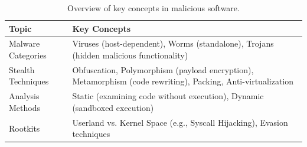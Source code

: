 \begin{table}[htbp]
\centering
\renewcommand{\arraystretch}{1.3}
\begin{tabular}{|l|p{10cm}|}
\hline
\textbf{Topic} & \textbf{Key Concepts} \\
\hline
Malware Categories & Viruses (host-dependent), Worms (standalone), Trojans (hidden malicious functionality) \\
Stealth Techniques & Obfuscation, Polymorphism (payload encryption), Metamorphism (code rewriting), Packing, Anti-virtualization \\
Analysis Methods & Static (examining code without execution), Dynamic (sandboxed execution) \\
Rootkits & Userland vs. Kernel Space (e.g., Syscall Hijacking), Evasion techniques \\
\hline
\end{tabular}
\caption{Overview of key concepts in malicious software.}
\label{tab:malware_summary}
\end{table}

